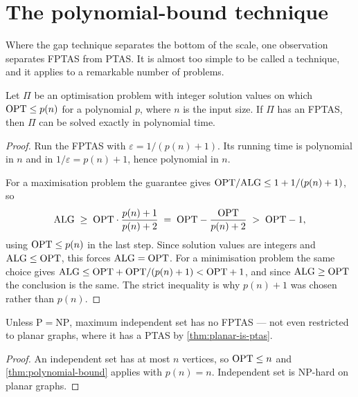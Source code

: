 \section{The polynomial-bound technique}
\label{sec:polynomial-bound}

Where the gap technique separates the bottom of the scale, one observation
separates FPTAS from PTAS. It is almost too simple to be called a technique,
and it applies to a remarkable number of problems.

\begin{theorem}\label{thm:polynomial-bound}
Let $\Pi$ be an optimisation problem with integer solution values on which
$\mathrm{OPT} \le p(n)$ for a polynomial $p$, where $n$ is the input size. If $\Pi$ has
an FPTAS, then $\Pi$ can be solved exactly in polynomial time.
\end{theorem}

\begin{proof}
Run the FPTAS with $\varepsilon = 1/(p(n)+1)$. Its running time is polynomial
in $n$ and in $1/\varepsilon = p(n)+1$, hence polynomial in $n$.

For a maximisation problem the guarantee gives
$\mathrm{OPT}/\mathrm{ALG} \le 1 + 1/(p(n)+1)$, so
\[ \mathrm{ALG} \;\ge\; \mathrm{OPT} \cdot \frac{p(n)+1}{p(n)+2}
   \;=\; \mathrm{OPT} - \frac{\mathrm{OPT}}{p(n)+2} \;>\; \mathrm{OPT} - 1, \]
using $\mathrm{OPT} \le p(n)$ in the last step. Since solution values are integers and
$\mathrm{ALG} \le \mathrm{OPT}$, this forces $\mathrm{ALG} = \mathrm{OPT}$. For a minimisation
problem the same choice gives
$\mathrm{ALG} \le \mathrm{OPT} + \mathrm{OPT}/(p(n)+1) < \mathrm{OPT} + 1$, and since
$\mathrm{ALG} \ge \mathrm{OPT}$ the conclusion is the same. The strict inequality is
why $p(n)+1$ was chosen rather than $p(n)$.
\end{proof}

\begin{corollary}\label{cor:no-fptas-is}
Unless $\mathrm{P} = \mathrm{NP}$, maximum independent set has no FPTAS --- not
even restricted to planar graphs, where it has a PTAS by
\cref{thm:planar-is-ptas}.
\end{corollary}

\begin{proof}
An independent set has at most $n$ vertices, so $\mathrm{OPT} \le n$ and
\cref{thm:polynomial-bound} applies with $p(n) = n$. Independent set is
\textrm{NP}-hard on planar graphs.
\end{proof}

